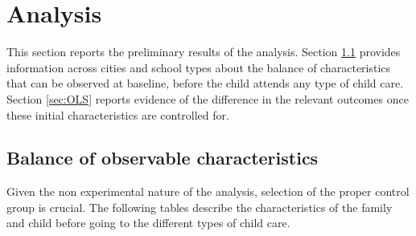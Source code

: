 \section{Analysis}
\label{sec:analysis}
This section reports the preliminary results of the analysis. 
Section \ref{sec:balance} provides information across cities and school types about the balance of characteristics that can be observed at baseline, before the child attends any type of child care.
Section \ref{sec:OLS} reports evidence of the difference in the relevant outcomes once these initial characteristics are controlled for.
\subsection{Balance of observable characteristics}
\label{sec:balance}
Given the non experimental nature of the analysis, selection of the proper control group is crucial. The following tables describe the characteristics of the family and child before going to the different types of child care. 

\singlespacing

